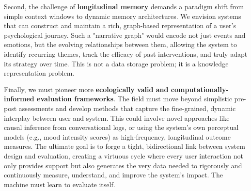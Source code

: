 Second, the challenge of \textbf{longitudinal memory} demands a paradigm shift from simple context windows to dynamic memory architectures. We envision systems that can construct and maintain a rich, graph-based representation of a user's psychological journey. Such a "narrative graph" would encode not just events and emotions, but the evolving relationships between them, allowing the system to identify recurring themes, track the efficacy of past interventions, and truly adapt its strategy over time. This is not a data storage problem; it is a knowledge representation problem.

Finally, we must pioneer more \textbf{ecologically valid and computationally-informed evaluation frameworks}. The field must move beyond simplistic pre-post assessments and develop methods that capture the fine-grained, dynamic interplay between user and system. This could involve novel approaches like causal inference from conversational logs, or using the system's own perceptual models (e.g., mood intensity scores) as high-frequency, longitudinal outcome measures. The ultimate goal is to forge a tight, bidirectional link between system design and evaluation, creating a virtuous cycle where every user interaction not only provides support but also generates the very data needed to rigorously and continuously measure, understand, and improve the system's impact. The machine must learn to evaluate itself. 